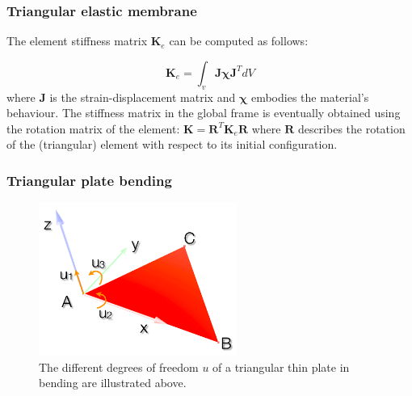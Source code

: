 \documentclass{llncs}
\begin{document}
\subsubsection{Triangular elastic membrane}

The element stiffness matrix $\textbf{K}_e$ can be computed as follows:

\begin{equation}
\textbf{K}_e = \int_v \textbf{J} \boldsymbol{\chi} \textbf{J}^{T} dV
\end{equation}
where $\textbf{J}$ is the strain-displacement matrix and $\boldsymbol\chi$ embodies the material's behaviour. The stiffness matrix in the global frame is eventually obtained using the rotation matrix of the element: $\textbf{K} = \textbf{R}^{T} \textbf{K}_e \textbf{R} $ where $\textbf{R}$ describes the rotation of the (triangular) element with respect to its initial configuration.

\subsubsection{Triangular plate bending}

\begin{figure}
\centering
\includegraphics[height=5cm]{images/bending}
\caption {The different degrees of freedom $u$ of a triangular thin plate in bending are illustrated above.}
\label{fig-triangle}
\end{figure}
\end{document}

